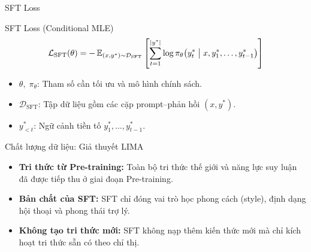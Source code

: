 \begin{frame}{SFT Loss}
  \begin{block}{SFT Loss (Conditional MLE)}
    \[
      \mathcal{L}_{\text{SFT}}(\theta) = -\operatorname{\mathbb{E}}_{(x, y^*) \sim \mathcal{D}_{\text{SFT}}} \left[ \sum_{t=1}^{|y^*|} \log \pi_\theta\big(y_t^* \;\big|\; x, y_1^*, \dots, y_{t-1}^*\big) \right]
    \]
  \end{block}

    \small
    \begin{itemize}
      \item $\theta,\; \pi_\theta$: Tham số cần tối ưu và mô hình chính sách.
      \item $\mathcal{D}_{\text{SFT}}$: Tập dữ liệu gồm các cặp prompt--phản hồi $(x, y^*)$.
      \item $y_{<t}^*$: Ngữ cảnh tiền tố $y_1^*, \dots, y_{t-1}^*$.
    \end{itemize}
  \par\vspace{0pt}
\end{frame}

\begin{frame}{Chất lượng dữ liệu: Giả thuyết LIMA}
  \small
  \begin{itemize}\setlength{\itemsep}{8pt}
    \item \textbf{Tri thức từ Pre-training:} Toàn bộ tri thức thế giới và năng lực suy luận đã được tiếp thu ở giai đoạn Pre-training.
    \item \textbf{Bản chất của SFT:} SFT chỉ đóng vai trò học phong cách (style), định dạng hội thoại và phong thái trợ lý.
    \item \textbf{Không tạo tri thức mới:} SFT không nạp thêm kiến thức mới mà chỉ kích hoạt tri thức sẵn có theo chỉ thị.
  \end{itemize}
  \par\vspace{0pt}
\end{frame}

